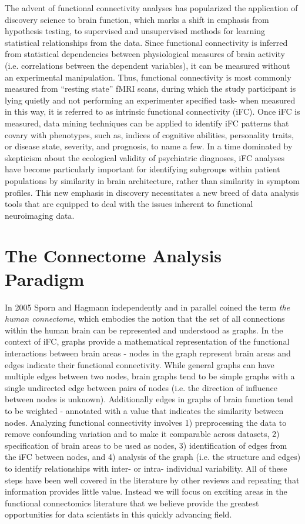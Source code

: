 The advent of functional connectivity analyses has popularized the application of discovery science to brain function, which marks a shift in emphasis from hypothesis testing, to supervised and unsupervised methods for learning statistical relationships from the data\cite{Biswal2010}. Since functional connectivity is inferred from statistical dependencies between physiological measures of brain activity (i.e. correlations between the dependent variables), it can be measured without an experimental manipulation. Thus, functional connectivity is most commonly measured from ``resting state'' fMRI scans, during which the study participant is lying quietly and not performing an experimenter specified task- when measured in this way, it is referred to as intrinsic functional connectivity (iFC)\cite{Biswal1995}. Once iFC is measured, data mining techniques can be applied to identify iFC patterns that covary with phenotypes, such as, indices of cognitive abilities, personality traits, or disease state, severity, and prognosis, to name a few\cite{Varoquaux2013}. In a time dominated by skepticism about the ecological validity of psychiatric diagnoses\cite{Kapur2012}, iFC analyses have become particularly important for identifying subgroups within patient populations by similarity in brain architecture, rather than similarity in symptom profiles. This new emphasis in discovery necessitates a new breed of data analysis tools that are equipped to deal with the issues inherent to functional neuroimaging data.

\section{The Connectome Analysis Paradigm}

In 2005 Sporn and Hagmann \cite{Sporns2005,Hagmann2005} independently and in parallel coined the term \textit{the human connectome}, which embodies the notion that the set of all connections within the human brain can be represented and understood as graphs. In the context of iFC, graphs provide a mathematical representation of the functional interactions between brain areas -  nodes in the graph represent brain areas and edges indicate their functional connectivity. While general graphs can have multiple edges between two nodes, brain graphs tend to be simple graphs with a single undirected edge between pairs of nodes (i.e. the direction of influence between nodes is unknown). Additionally edges in graphs of brain function tend to be weighted - annotated with a value that indicates the similarity between nodes. Analyzing functional connectivity involves 1) preprocessing the data to remove confounding variation and to make it comparable across datasets, 2) specification of brain areas to be used as nodes, 3) identification of edges from the iFC between nodes, and 4) analysis of the graph (i.e. the structure and edges) to identify relationships with inter- or intra- individual variability. All of these steps have been well covered in the literature  by other reviews and repeating that information provides little value. Instead we will focus on exciting areas in the functional connectomics literature that we believe provide the greatest opportunities for data scientists in this quickly advancing field.

